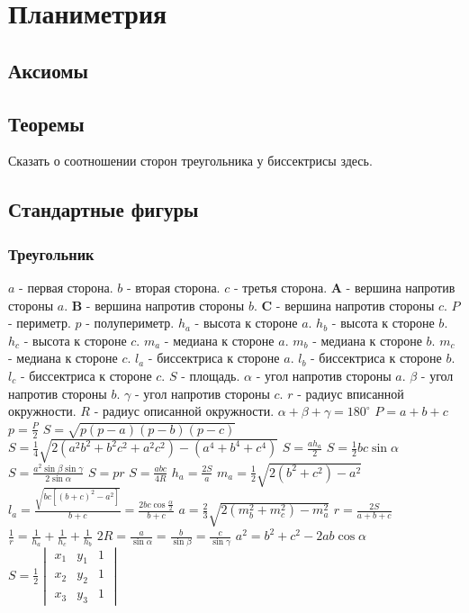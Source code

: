 \section{Планиметрия}
\subsection{Аксиомы}
\subsection{Теоремы}
Сказать о соотношении сторон треугольника у биссектрисы здесь.
\subsection{Стандартные фигуры}
\subsubsection{Треугольник}
$a$ - первая сторона.
$b$ - вторая сторона.
$c$ - третья сторона.
$\boldsymbol{A}$ - вершина напротив стороны $a$.
$\boldsymbol{B}$ - вершина напротив стороны $b$.
$\boldsymbol{C}$ - вершина напротив стороны $c$.
$P$ - периметр.
$p$ - полупериметр.
$h_a$ - высота к стороне $a$.
$h_b$ - высота к стороне $b$.
$h_c$ - высота к стороне $c$.
$m_a$ - медиана к стороне $a$.
$m_b$ - медиана к стороне $b$.
$m_c$ - медиана к стороне $c$.
$l_a$ - биссектриса к стороне $a$.
$l_b$ - биссектриса к стороне $b$.
$l_c$ - биссектриса к стороне $c$.
$S$ - площадь.
$\alpha$ - угол напротив стороны $a$.
$\beta$ - угол напротив стороны $b$.
$\gamma$ - угол напротив стороны $c$.
$r$ - радиус вписанной окружности.
$R$ - радиус описанной окружности.
$ \alpha + \beta + \gamma = 180^{\circ} $
$ P = a + b + c $
$ p = \frac{P}{2} $
$ S = \sqrt{p(p-a)(p-b)(p-c)} $
$ S = \frac{1}{4}\sqrt{2(a^2 b^2 + b^2 c^2 + a^2 c^2) - (a^4 + b^4 + c^4)} $
$S = \frac{a h_a}{2} $
$ S = \frac{1}{2} b c \sin \alpha $
$ S = \frac{a^2 \sin \beta \sin \gamma}{2 \sin \alpha} $
$ S = p r $
$ S = \frac{abc}{4 R} $
$ h_a = \frac{2 S}{a} $
$ m_a = \frac{1}{2} \sqrt{2(b^2 + c^2) - a^2} $
$ l_a = \frac{\sqrt{bc[(b+c)^2-a^2]}}{b+c} = \frac{2 b c \cos \frac{\alpha}{2}}{b + c} $
$ a = \frac{2}{3}\sqrt{2(m_b^2 + m_c^2) - m_a^2} $
$ r = \frac{2 S}{a + b + c} $
$ \frac{1}{r} = \frac{1}{h_a} + \frac{1}{h_c} + \frac{1}{h_b} $
$ 2 R = \frac{a}{\sin \alpha} = \frac{b}{\sin \beta} = \frac{c}{\sin \gamma} $
$ a^2 = b^2 + c^2 - 2 a b \cos \alpha $
$ S = \frac{1}{2} \begin{vmatrix}
	x_1 & y_1 & 1 \\
	x_2 & y_2 & 1 \\
	x_3 & y_3 & 1
\end{vmatrix} $
